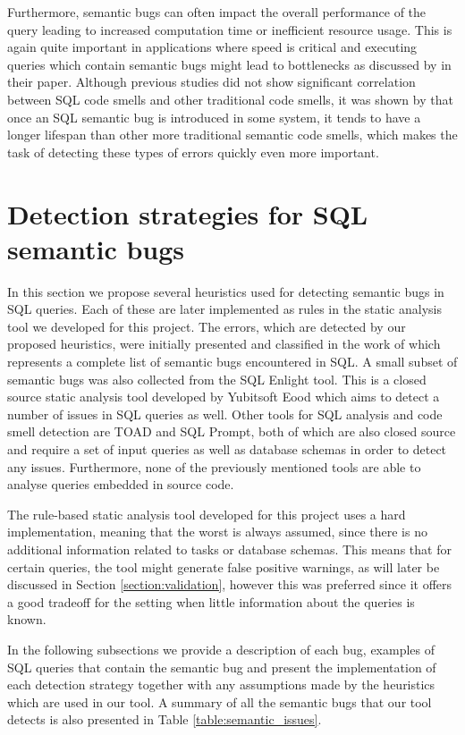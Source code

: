 Furthermore, semantic bugs can often impact the overall performance of the query leading to increased computation time or inefficient resource usage. This is again quite important in applications where speed is critical and executing queries which contain semantic bugs might lead to bottlenecks as discussed by \citet{P010} in their paper. Although previous studies did not show significant correlation between SQL code smells and other traditional code smells, it was shown by \citet{P010} that once an SQL semantic bug is introduced in some system, it tends to have a longer lifespan than other more traditional semantic code smells, which makes the task of detecting these types of errors quickly even more important.

\section{Detection strategies for SQL semantic bugs}
\label{section:detection_strategies}

In this section we propose several heuristics used for detecting semantic bugs in SQL queries. Each of these are later implemented as rules in the static analysis tool we developed for this project. The errors, which are detected by our proposed heuristics, were initially presented and classified in the work of \citet{P001} which represents a complete list of semantic bugs encountered in SQL. A small subset of semantic bugs was also collected from the SQL Enlight tool. This is a closed source static analysis tool developed by Yubitsoft Eood which aims to detect a number of issues in SQL queries as well. Other tools for SQL analysis and code smell detection are TOAD and SQL Prompt, both of which are also closed source and require a set of input queries as well as database schemas in order to detect any issues. Furthermore, none of the previously mentioned tools are able to analyse queries embedded in source code.

The rule-based static analysis tool developed for this project uses a hard implementation, meaning that the worst is always assumed, since there is no additional information related to tasks or database schemas. This means that for certain queries, the tool might generate false positive warnings, as will later be discussed in Section \ref{section:validation}, however this was preferred since it offers a good tradeoff for the setting when little information about the queries is known.

In the following subsections we provide a description of each bug, examples of SQL queries that contain the semantic bug and present the implementation of each detection strategy together with any assumptions made by the heuristics which are used in our tool. A summary of all the semantic bugs that our tool detects is also presented in Table \ref{table:semantic_issues}.

